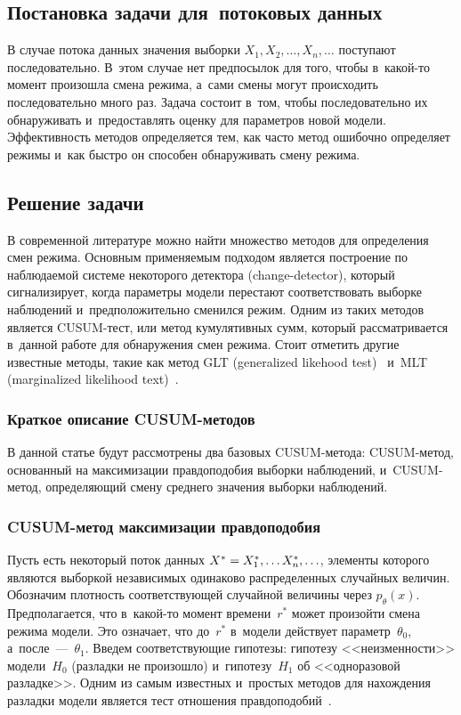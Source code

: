 \begin{multicols}{2}
        

\subsection{Постановка задачи для~потоковых данных}

            В случае потока данных значения выборки $X_1,X_2,\ldots,X_n, \ldots$ 
поступают последовательно. В~этом случае нет предпосылок для того, чтобы 
в~ка\-кой-то момент произошла смена режима, а~сами смены могут происходить 
последовательно много раз. Задача состоит в~том, чтобы последовательно их 
обнаруживать и~предоставлять оценку для параметров новой модели. Эффективность 
методов определяется тем, как часто метод ошибочно определяет режимы и~как 
быстро он способен обнаруживать смену режима.

\subsection{Решение задачи}

В современной литературе можно найти множество методов  для определения смен 
режима. Основным применяемым подходом является по\-стро\-ение по наблюдаемой системе  
некоторого детектора (change-detector), который сигнализирует, когда параметры 
модели перестают соответствовать выборке наблюдений и~предположительно сменился 
режим. Одним из таких методов  является CUSUM-тест, или метод кумулятивных сумм, 
который рассматривается в~данной работе для обнаружения смен режима. Стоит 
отметить другие известные методы, такие как метод GLT (generalized likehood 
test)~\cite{appel} и~MLT (marginalized likelihood text)~\cite{gustafsson}.

\subsubsection{Краткое описание CUSUM-методов}

В данной статье будут рассмотрены два базовых CUSUM-ме\-то\-да: CUSUM-ме\-тод, 
основанный на максимизации правдоподобия выборки наблюдений, и~CUSUM-ме\-тод, 
определяющий смену среднего значения выборки наблюдений.

\subsubsection*{CUSUM-метод максимизации правдоподобия}

Пусть есть некоторый поток данных $X^* \hm= X^*_1,\ldots X^*_n,\ldots $, 
элементы которого 
являются выборкой независимых одинаково распределенных случайных величин. 
Обозначим плотность соответствующей случайной величины через $p_\theta(x).$ 
Предполагается, что в~ка\-кой-то момент времени~$r^*$ может произойти смена режима 
модели. Это означает, что до~$r^*$ в~модели действует параметр~$\theta_0$, 
а~после~---~$\theta_1$. Введем соответствующие гипотезы: гипотезу <<неизменности>> 
модели~$H_0$ (разладки не произошло) и~гипотезу~$H_1$ об <<одноразовой 
разладке>>. Одним из самым известных и~простых методов для нахождения разладки 
модели является тест отношения правдоподобий~\cite{kay}.


\end{multicols}

